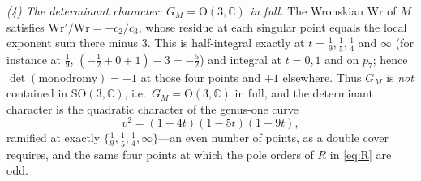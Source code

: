 \documentclass[11pt]{article}
\theoremstyle{plain}
\theoremstyle{remark}
\begin{document}
\emph{(4) The determinant character: $G_M=\mathrm{O}(3,\mathbb{C})$ in full.} The Wronskian $\mathrm{Wr}$ of $M$ satisfies
$\mathrm{Wr}'/\mathrm{Wr}=-c_2/c_3$, whose residue at each singular point equals the local exponent sum there minus $3$. This is
half-integral exactly at $t=\tfrac19,\tfrac15,\tfrac14$ and $\infty$ (for instance at $\tfrac19$,
$(-\tfrac12+0+1)-3=-\tfrac52$) and integral at $t=0,1$ and on $p_7$; hence $\det(\text{monodromy})=-1$ at those
four points and $+1$ elsewhere. Thus $G_M$ is \emph{not} contained in $\mathrm{SO}(3,\mathbb{C})$, i.e.\
$G_M=\mathrm{O}(3,\mathbb{C})$ in full, and the determinant character is the quadratic character of the genus-one
curve
\begin{equation}
v^2=(1-4t)(1-5t)(1-9t),
\label{eq:twist}
\end{equation}
ramified at exactly $\{\tfrac19,\tfrac15,\tfrac14,\infty\}$---an even number of points, as a double cover requires,
and the same four points at which the pole orders of $R$ in \eqref{eq:R} are odd.
\end{document}
